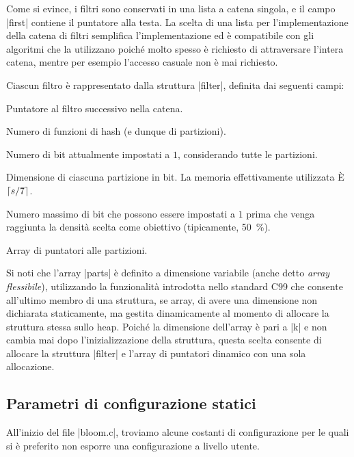 Come si evince, i filtri sono conservati in una lista a catena singola, e il campo \cverb|first|
contiene il puntatore alla testa. La scelta di una lista per l'implementazione della catena di
filtri semplifica l'implementazione ed è compatibile con gli algoritmi che la utilizzano poiché
molto spesso è richiesto di attraversare l'intera catena, mentre per esempio l'accesso casuale non è
mai richiesto.

Ciascun filtro è rappresentato dalla struttura \cverb|filter|, definita dai seguenti campi:

\begin{description}[labelindent=2\parindent,leftmargin=!,labelwidth=8em,font={\bfseries\ttfamily}]
  \item[filter *next] Puntatore al filtro successivo nella catena.
  \item[uint32 k] Numero di funzioni di hash (e dunque di par\-ti\-zio\-ni).
  \item[uint64 b] Numero di bit attualmente impostati a $1$, con\-si\-de\-ran\-do tutte le
    partizioni.
  \item[uint64 s] Dimensione di ciascuna partizione in bit. La memoria effettivamente utilizzata È
      $\lceil s/7\rceil$.
  \item[uint64 bmax] Numero massimo di bit che possono essere impostati a $1$ prima che venga
      raggiunta la densità scelta come obiettivo (tipicamente, \SI{50}{\percent}).
  \item[{uint8 *parts[]}] Array di puntatori alle partizioni.
\end{description}

Si noti che l'array \cverb|parts| è definito a dimensione variabile (anche detto \emph{array
flessibile}), utilizzando la funzionalità introdotta nello standard C99 che consente all'ultimo
membro di una struttura, se array, di avere una dimensione non dichiarata staticamente, ma gestita
dinamicamente al momento di allocare la struttura stessa sullo heap. Poiché la dimensione dell'array
è pari a \cverb|k| e non cambia mai dopo l'inizializzazione della struttura, questa scelta consente
di allocare la struttura \cverb|filter| e l'array di puntatori dinamico con una sola allocazione.

\subsection{Parametri di configurazione statici}
\label{sec:patch:staticparms}

All'inizio del file \cverb|bloom.c|, troviamo alcune costanti di configurazione per le quali si è
preferito non esporre una configurazione a livello utente.

